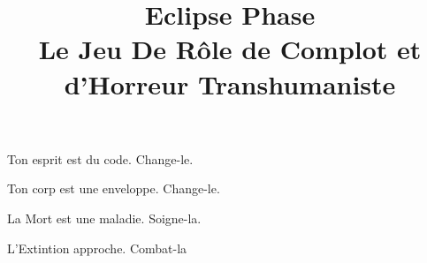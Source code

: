 \documentclass{book}
\begin{document}
 

\title{Eclipse Phase\\ Le Jeu De Rôle de Complot et d'Horreur Transhumaniste} \date{} 

\maketitle



\begin{frontmatter} 

\begin{center} Ton esprit est du code. Change-le. 

Ton corp est une enveloppe. Change-le. 

La Mort est une maladie. Soigne-la. 

L'Extintion approche. Combat-la \end{center} 

\newpage



 

\tableofcontents



\end{frontmatter} 

\begin{mainmatter} 

 

\end{mainmatter} 
\end{document}
